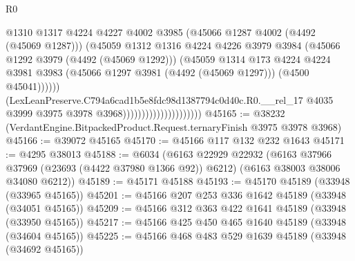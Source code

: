 \begin{lexlean}{R0}
\begin{coremodule}
                                                  @1310
                                                  @1317
                                                  @4224
                                                  @4227
                                                  @4002
                                                  @3985
                                                  (@45066 @1287 @4002 (@4492 (@45069 @1287)))
                                                  (@45059
                                                    @1312
                                                    @1316
                                                    @4224
                                                    @4226
                                                    @3979
                                                    @3984
                                                    (@45066 @1292 @3979 (@4492 (@45069 @1292)))
                                                    (@45059
                                                      @1314
                                                      @173
                                                      @4224
                                                      @4224
                                                      @3981
                                                      @3983
                                                      (@45066 @1297 @3981 (@4492 (@45069 @1297)))
                                                      (@4500 @45041))))))
                                            (LexLeanPreserve.C794a6cad1b5e8fdc98d1387794c0d40c.R0.__rel_17
                                              @4035
                                              @3999
                                              @3975
                                              @3978
                                              @3968)))))))))))))))))))))
@45165 := @38232 (VerdantEngine.BitpackedProduct.Request.ternaryFinish @3975 @3978 @3968)
@45166 := @39072 @45165
@45170 := @45166 @117 @132 @232 @1643
@45171 := @4295 @38013
@45188 := @6034
    (@6163
      @22929
      @22932
      (@6163 @37966 @37969 (@23693 (@4422 @37980 @1366 @92)) @6212)
      (@6163 @38003 @38006 @34080 @6212))
@45189 := @45171 @45188
@45193 := @45170 @45189 (@33948 (@33965 @45165))
@45201 := @45166 @207 @253 @336 @1642 @45189 (@33948 (@34051 @45165))
@45209 := @45166 @312 @363 @422 @1641 @45189 (@33948 (@33950 @45165))
@45217 := @45166 @425 @450 @465 @1640 @45189 (@33948 (@34604 @45165))
@45225 := @45166 @468 @483 @529 @1639 @45189 (@33948 (@34692 @45165))

\end{coremodule}
\end{lexlean}
